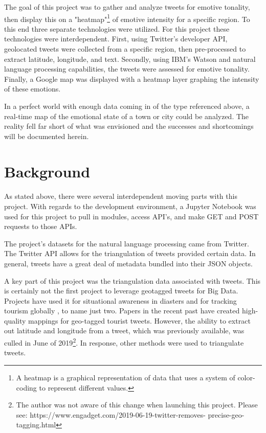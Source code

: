 \documentclass[12pt, oneside]{article}
\begin{document}
The goal of this project was to gather and analyze tweets for emotive tonality,
then display this on a "heatmap"\footnote{A heatmap is a graphical
representation of data that uses a system of color-coding to represent
different values.} of emotive intensity for a specific
region. To this end three separate technologies were utilized. For this
project  these technologies were interdependent. First, using Twitter's
developer API, geolocated tweets were collected from a specific region, then
pre-processed to extract latitude, longitude, and text. Secondly, using IBM's
Watson and natural language processing capabilities, the tweets were assessed
for emotive tonality. Finally, a Google map was
displayed with a heatmap layer graphing the intensity of these emotions.

In a perfect world with enough data coming in of the type referenced above, a
real-time map of the emotional state of a town or city could be analyzed. The
reality fell far short of what was envisioned and the successes and
shortcomings will be documented herein.


\section{Background}
\paragraph{}
As stated above, there were several interdependent moving parts with this
project. With regards to the development environment, a Jupyter Notebook was
used for this project to pull in modules, access API's, and make GET and POST
requests to those APIs.

The project's datasets for the natural language processing came from Twitter.
The Twitter API allows for the triangulation of tweets provided certain
data\cite{TwitterGeo}. In general, tweets have a great deal of metadata bundled
into their JSON objects.

A key part of this project was the triangulation data associated with
tweets. This is certainly not the first project to leverage geotagged tweets
for Big Data. Projects have used it for situational awareness in
diasters\cite{verma2011} and for tracking tourism globally \cite{tourism2013},
to name just two. Papers in the recent past have created high-quality mappings
for geo-tagged tourist tweets\cite{tourist2018}. However, the ability to
extract out latitude and longitude
from a tweet, which was previously available, was culled in June of
2019\footnote{The author was not aware of this change when launching this
project. Please see: https://www.engadget.com/2019-06-19-twitter-removes-
precise-geo-tagging.html}. In response, other methods were used to triangulate
tweets.
\end{document}
